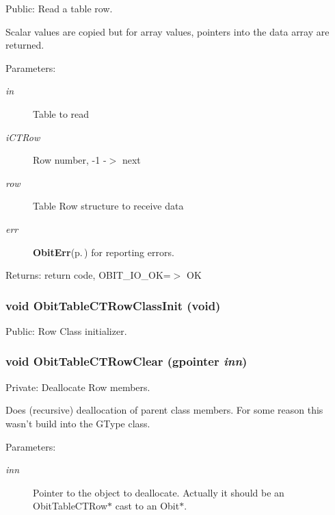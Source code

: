 Public: Read a table row. 

Scalar values are copied but for array values, pointers into the data array are returned. \begin{Desc}
\item[Parameters:]
\begin{description}
\item[{\em in}]Table to read \item[{\em i\-CTRow}]Row number, -1 -$>$ next \item[{\em row}]Table Row structure to receive data \item[{\em err}]{\bf Obit\-Err}{\rm (p.\,\pageref{structObitErr})} for reporting errors. \end{description}
\end{Desc}
\begin{Desc}
\item[Returns:]return code, OBIT\_\-IO\_\-OK=$>$ OK \end{Desc}
\subsubsection{\setlength{\rightskip}{0pt plus 5cm}void Obit\-Table\-CTRow\-Class\-Init (void)}\label{ObitTableCT_8c_a26}


Public: Row Class initializer. 

\subsubsection{\setlength{\rightskip}{0pt plus 5cm}void Obit\-Table\-CTRow\-Clear (gpointer {\em inn})}\label{ObitTableCT_8c_a7}


Private: Deallocate Row members. 

Does (recursive) deallocation of parent class members. For some reason this wasn't build into the GType class. \begin{Desc}
\item[Parameters:]
\begin{description}
\item[{\em inn}]Pointer to the object to deallocate. Actually it should be an Obit\-Table\-CTRow$\ast$ cast to an Obit$\ast$. \end{description}
\end{Desc}
